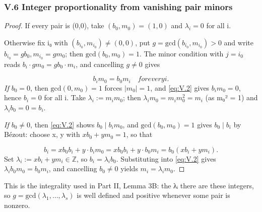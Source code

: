 \documentclass[11pt]{article}
\theoremstyle{plain}
\theoremstyle{definition}
\theoremstyle{remark}
\theoremstyle{plain}
\theoremstyle{definition}
\theoremstyle{remark}
\newcounter{Part}
\theoremstyle{plain}
\newtheorem{lemmaPart}[Part]{Lemma}
\theoremstyle{definition}
\theoremstyle{remark}
\begin{document}
\subsubsection*{V.6 Integer proportionality from vanishing pair minors}
\begin{proof}
If every pair is (0,0), take $(b_{0}, m_{0}) = (1, 0)$ and $λ_{i} = 0$ for all i.

Otherwise fix i₀ with $(b_{i_{0}}, m_{i_{0}}) ≠ (0,0)$, put $g = \mathrm{gcd}(b_{i_{0}}, m_{i_{0}}) > 0$ and write $b_{i_{0}} = g b_{0}, m_{i_{0}} = g m_{0}$; then $\mathrm{gcd}(b_{0}, m_{0}) = 1$. The minor condition with $j = i_{0}$ reads $b_{i}·g m_{0} = g b_{0}·m_{i}$, and cancelling $g ≠ 0$ gives

\begin{equation}\tag{V.2}\label{eq:V.2}
b_{i} m_{0} = b_{0} m_{i} \quad for every i.
\end{equation}
\emph{If $b_{0} = 0$}, then $\mathrm{gcd}(0, m_{0}) = 1$ forces $|m_{0}| = 1$, and \eqref{eq:V.2} gives $b_{i} m_{0} = 0$, hence $b_{i} = 0$ for all i. Take $λ_{i} := m_{i} m_{0}$; then $λ_{i} m_{0} = m_{i} m_{0}^{2} = m_{i}$ (as m₀² = 1) and $λ_{i} b_{0} = 0 = b_{i}$.

\emph{If $b_{0} ≠ 0$}, then \eqref{eq:V.2} shows $b_{0} ∣ b_{i} m_{0}$, and $\mathrm{gcd}(b_{0}, m_{0}) = 1$ gives $b_{0} ∣ b_{i}$ by Bézout: choose x, y with $x b_{0} + y m_{0} = 1$, so that

\[
b_{i} = x b_{0} b_{i} + y·b_{i} m_{0} = x b_{0} b_{i} + y·b_{0} m_{i} = b_{0}(x b_{i} + y m_{i}).
\]
Set $λ_{i} := x b_{i} + y m_{i} ∈ ℤ$, so $b_{i} = λ_{i} b_{0}$. Substituting into \eqref{eq:V.2} gives $λ_{i} b_{0} m_{0} = b_{0} m_{i}$, and cancelling $b_{0} ≠ 0$ yields $m_{i} = λ_{i} m_{0}$.

\end{proof}
This is the integrality used in Part II, Lemma 3B: the λᵢ there are these integers, so $g = \mathrm{gcd}(λ_{1}, …, λ_{s})$ is well defined and positive whenever some pair is nonzero.
\end{document}
